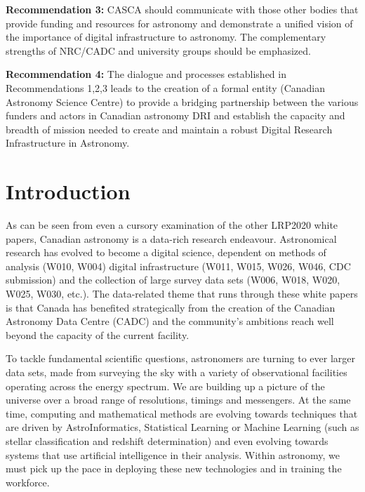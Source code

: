 \documentclass[11pt]{article}
\begin{document}
{\bf Recommendation 3:} CASCA should communicate with those other bodies that provide funding and resources for astronomy and demonstrate a unified vision of the importance of digital infrastructure to astronomy. The complementary strengths of NRC/CADC and university groups should be emphasized.

{\bf Recommendation 4:} The dialogue and processes established in Recommendations 1,2,3 leads to the creation of a formal entity (Canadian Astronomy Science Centre) to provide a bridging partnership between the various funders and actors in Canadian astronomy DRI and establish the capacity and breadth of mission needed to create and maintain a robust Digital Research Infrastructure in Astronomy.

\section{Introduction}

As can be seen from even a cursory examination of the other LRP2020 white papers, Canadian astronomy is a data-rich research endeavour.  Astronomical research has evolved to become a digital science, dependent on methods of analysis (W010, W004) digital infrastructure (W011, W015, W026, W046, CDC submission) and the collection of large survey data sets (W006, W018, W020, W025, W030, etc.).  The data-related theme that runs through these white papers is that Canada has benefited strategically from the creation of the Canadian Astronomy Data Centre (CADC) and the community's ambitions reach well beyond the capacity of the current facility. 

To tackle fundamental scientific questions, astronomers are turning to ever larger data sets, made from surveying the sky with a variety of observational facilities operating across the energy spectrum. We are building up a picture of the universe over a broad range of resolutions, timings and messengers.  At the same time, computing and mathematical methods are evolving towards techniques that are driven by AstroInformatics, Statistical Learning or Machine Learning (such as stellar classification and redshift determination) and even evolving towards systems that use artificial intelligence in their analysis.  Within astronomy, we must pick up the pace in deploying these new technologies and in training the workforce.
\end{document}

